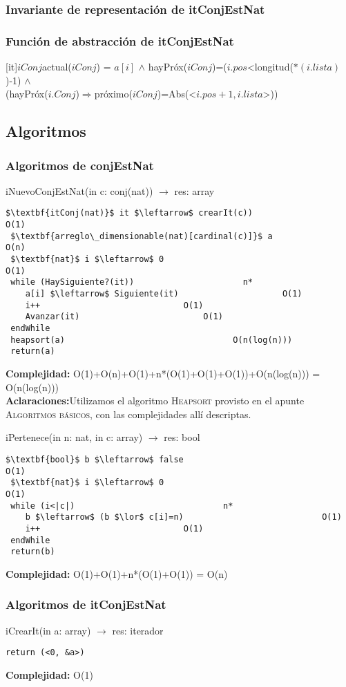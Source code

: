 \subsubsection{Invariante de representaci\'on de itConjEstNat}
  \subsubsection{Funci\'on de abstracci\'on de itConjEstNat}
	[it]{$iConj$}{actual($iConj$) = $a[i]$ $\land$ hayPr\'ox($iConj$)=($i.pos$<longitud($*(i.lista)$)-1) $\land$ \\(hayPr\'ox($i.Conj$)$\Rightarrow$pr\'oximo($iConj$)=Abs(<$i.pos+1, i.lista$>))}
	
\subsection{Algoritmos}
\subsubsection{Algoritmos de conjEstNat}
iNuevoConjEstNat(in c: conj(nat)) $\rightarrow$ res: array
\begin{lstlisting}[mathescape]
 $\textbf{itConj(nat)}$ it $\leftarrow$ crearIt(c))								O(1)
 $\textbf{arreglo\_dimensionable(nat)[cardinal(c)]}$ a										O(n)
 $\textbf{nat}$ i $\leftarrow$ 0										O(1)
 while (HaySiguiente?(it))						n*
 	a[i] $\leftarrow$ Siguiente(it)						O(1)
 	i++								O(1)
 	Avanzar(it)							O(1)
 endWhile
 heapsort(a)						  		  O(n(log(n)))
 return(a)
\end{lstlisting}
\textbf{Complejidad:} O(1)+O(n)+O(1)+n*(O(1)+O(1)+O(1))+O(n(log(n))) = O(n(log(n)))\\
\textbf{Aclaraciones:}Utilizamos el algoritmo \textsc{Heapsort} provisto en el apunte \textsc{Algoritmos b\'asicos}, con las complejidades all\'i descriptas.


iPertenece(in n: nat, in c: array) $\rightarrow$ res: bool
\begin{lstlisting}[mathescape]
 $\textbf{bool}$ b $\leftarrow$ false									O(1)
 $\textbf{nat}$ i $\leftarrow$ 0										O(1)
 while (i<|c|)								n*
 	b $\leftarrow$ (b $\lor$ c[i]=n)							O(1)
 	i++								O(1)
 endWhile
 return(b)
\end{lstlisting}
\textbf{Complejidad:} O(1)+O(1)+n*(O(1)+O(1)) = O(n)\\

\subsubsection{Algoritmos de itConjEstNat}
iCrearIt(in a: array) $\rightarrow$ res: iterador
\begin{lstlisting}[mathescape]
 return (<0, &a>)
\end{lstlisting}
\textbf{Complejidad:} O(1)\\

